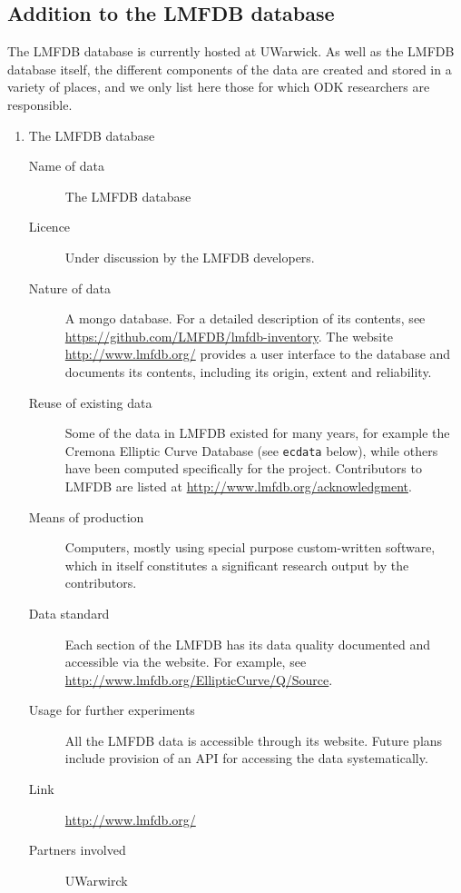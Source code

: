 \documentclass{../../Proposal/LaTeX-proposal/deliverablereport}
\begin{document}
\subsection{Addition to the LMFDB database}

The LMFDB database is currently hosted at UWarwick.  As well as the LMFDB database itself, the different components of the data are created and stored in a variety of places, and we only list here those for which ODK researchers are responsible.

\begin{enumerate}

\item{The LMFDB database}
\begin{description}
\item[Name of data] The LMFDB database
\item[Licence]  Under discussion by the LMFDB developers.
\item[Nature of data] A mongo database.  For a detailed description of its contents, see \url{https://github.com/LMFDB/lmfdb-inventory}. The website \url{http://www.lmfdb.org/} provides a user interface to the database and documents its contents, including its origin, extent and reliability.
\item[Reuse of existing data] Some of the data in LMFDB existed for many years, for example the Cremona Elliptic Curve Database (see {\tt ecdata} below), while others have been computed specifically for the project.   Contributors to LMFDB are listed at \url{http://www.lmfdb.org/acknowledgment}.
\item[Means of production] Computers, mostly using special purpose custom-written software, which in itself constitutes a significant research output by the contributors.
\item[Data standard] Each section of the LMFDB has its data quality documented and accessible via the website.  For example, see  \url{http://www.lmfdb.org/EllipticCurve/Q/Source}.
\item [Usage for further experiments] All the LMFDB data is accessible through its website.  Future plans include provision of an API for accessing the data systematically.
\item [Link]  \url{http://www.lmfdb.org/}
\item[Partners involved] UWarwirck
\end{description}


\end{enumerate}
\end{document}
